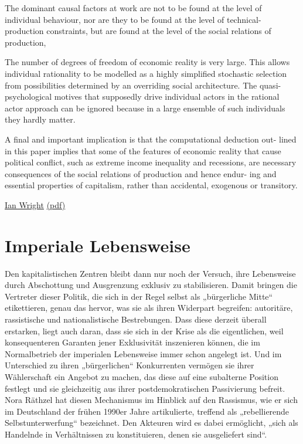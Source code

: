 \documentclass[
]{book}
\begin{document}
The dominant causal
factors at work are not to be found at the level of individual behaviour, nor are
they to be found at the level of technical-production constraints, but are found
at the level of the social relations of production,

The
number of degrees of freedom of economic reality is very large. This allows
individual rationality to be modelled as a highly simplified stochastic selection
from possibilities determined by an overriding social architecture. The quasi-
psychological motives that supposedly drive individual actors in the rational
actor approach can be ignored because in a large ensemble of such individuals
they hardly matter.

A final and important implication is that the computational deduction out-
lined in this paper implies that some of the features of economic reality that
cause political conflict, such as extreme income inequality and recessions, are
necessary consequences of the social relations of production and hence endur-
ing and essential properties of capitalism, rather than accidental, exogenous
or transitory.

\href{https://ianwrightsite.wordpress.com/2017/11/16/the-social-architecture-of-capitalism/}{Ian Wright}
\href{pdf/Ian_Wright_2005-Social_Architecture_of_Capitalism.pdf}{(pdf)}

\hypertarget{imperiale-lebensweise}{%
\section{Imperiale Lebensweise}\label{imperiale-lebensweise}}

Den kapitalistischen Zentren bleibt dann nur noch der Versuch, ihre Lebensweise durch Abschottung und Ausgrenzung exklusiv zu stabilisieren. Damit bringen die Vertreter dieser Politik, die sich in der Regel selbst als „bürgerliche Mitte`` etikettieren, genau das hervor, was sie als ihren Widerpart begreifen: autoritäre, rassistische und nationalistische Bestrebungen. Dass diese derzeit überall erstarken, liegt auch daran, dass sie sich in der Krise als die eigentlichen, weil konsequenteren Garanten jener Exklusivität inszenieren können, die im Normalbetrieb der imperialen Lebensweise immer schon angelegt ist. Und im Unterschied zu ihren „bürgerlichen`` Konkurrenten vermögen sie ihrer Wählerschaft ein Angebot zu machen, das diese auf eine subalterne Position festlegt und sie gleichzeitig aus ihrer postdemokratischen Passivierung befreit. Nora Räthzel hat diesen Mechanismus im Hinblick auf den Rassismus, wie er sich im Deutschland der frühen 1990er Jahre artikulierte, treffend als „rebellierende Selbstunterwerfung`` bezeichnet. Den Akteuren wird es dabei ermöglicht, „sich als Handelnde in Verhältnissen zu konstituieren, denen sie ausgeliefert sind``.
\end{document}
